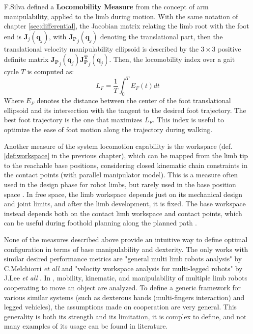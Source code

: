 F.Silva\cite{LocomotionPerformance} defined a \textbf{Locomobility Measure} from the concept of arm manipulability\cite{ManipulabilityYoshikawa}, applied to the limb during motion. 
With the same notation of chapter \ref{sec:differential}, the Jacobian matrix relating the limb root with the foot end is $\mathbf{J}_j(\mathbf{q}_j)$, with $\mathbf{J_P}_j(\mathbf{q}_j)$ denoting the translational part, then the translational velocity manipulability ellipsoid is described by the $3\times3$ positive definite matrix $\mathbf{J_P}_j(\mathbf{q}_j)\mathbf{J^T_P}_j(\mathbf{q}_j)$. 
Then, the locomobility index over a gait cycle $T$ is computed as: 
\begin{equation}
\label{eq:Locomobility}
    L_F = \frac{1}{T} \int_0^T{E_F(t)dt}  
\end{equation}
Where $E_F$ denotes the distance between the center of the foot translational ellipsoid and its intersection with the tangent to the desired foot trajectory. 
The best foot trajectory is the one that maximizes $L_F$. 
This index is useful to optimize the ease of foot motion along the trajectory during walking.

Another measure of the system locomotion capability is the workspace (def.\ref{def:workspace} in the previous chapter), which can be mapped from the limb tip to the reachable base positions, considering closed kinematic chain constraints in the contact points (with parallel manipulator model). This is a measure often used in the design phase for robot limbs, but rarely used in the base position space \cite{HexapodBaseWorkspace}\cite{HexapodBaseWorkspace2}. In free space, the limb workspace depends just on its mechanical design and joint limits, and after the limb development, it is fixed. The base workspace instead depends both on the contact limb workspace and contact points, which can be useful during foothold planning along the planned path \cite{LIMBEROTakadaThesis}\cite{LeggedPlanning1}\cite{threeLeggedDexterity}
. 

None of the measures described above provide an intuitive way to define optimal configuration in terms of base manipulability and dexterity. The only works with similar desired performance metrics are "general multi limb robots analysis" by C.Melchiorri \textit{et all} \cite{MultiLimbManipulabilityMelchiorri} and "velocity workspace analysis for multi-legged robots" by J.Lee \textit{et all}  
\cite{velocityWorkspacePolytope}.
In \cite{MultiLimbManipulabilityMelchiorri}, mobility, kinematic, and manipulability of multiple limb robots cooperating to move an object are analyzed. To define a generic framework for various similar systems (such as dexterous hands (multi-fingers interaction) and legged vehicles), the assumptions made on cooperation are very general.
This generality is both its strength and its limitation, it is complex to define, and not many examples of its usage can be found in literature.  

